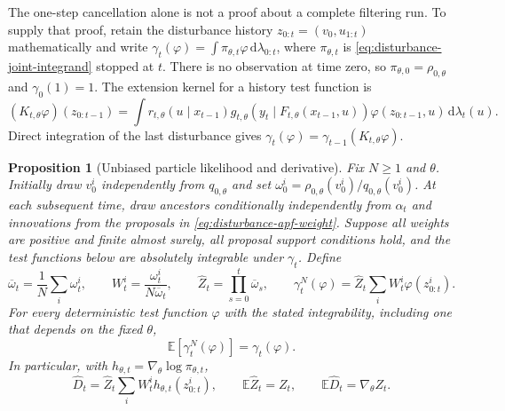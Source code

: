\documentclass[11pt]{article}
\newtheorem{proposition}{Proposition}
\newcommand{\dd}{\mathrm{d}}
\begin{document}
The one-step cancellation alone is not a proof about a complete filtering
run. To supply that proof, retain the disturbance history
$z_{0:t}=(v_0,u_{1:t})$ mathematically and write
$\gamma_t(\varphi)=\int\pi_{\theta,t}\varphi\,\dd\lambda_{0:t}$, where
$\pi_{\theta,t}$ is \eqref{eq:disturbance-joint-integrand} stopped at $t$.
There is no observation at time zero, so $\pi_{\theta,0}=\rho_{0,\theta}$
and $\gamma_0(1)=1$. The extension kernel for a history test function is
\begin{equation}
 (K_{t,\theta}\varphi)(z_{0:t-1})
 =\int r_{t,\theta}(u\mid x_{t-1})
       g_{t,\theta}(y_t\mid F_{t,\theta}(x_{t-1},u))
       \varphi(z_{0:t-1},u)\,\dd\lambda_t(u).
 \label{eq:disturbance-history-kernel}
\end{equation}
Direct integration of the last disturbance gives
$\gamma_t(\varphi)=\gamma_{t-1}(K_{t,\theta}\varphi)$.

\begin{proposition}[Unbiased particle likelihood and derivative]
\label{prop:disturbance-particle-induction}
Fix $N\geq1$ and $\theta$. Initially draw $v_0^i$ independently from
$q_{0,\theta}$ and set
$\omega_0^i=\rho_{0,\theta}(v_0^i)/q_{0,\theta}(v_0^i)$.
At each subsequent time, draw ancestors conditionally independently from
$\alpha_t$ and innovations from the proposals in
\eqref{eq:disturbance-apf-weight}. Suppose all weights are positive and
finite almost surely, all proposal support conditions hold, and the test
functions below are absolutely integrable under $\gamma_t$. Define
\begin{equation}
 \overline\omega_t=\frac1N\sum_i\omega_t^i,\qquad
 W_t^i=\frac{\omega_t^i}{N\overline\omega_t},\qquad
 \widehat Z_t=\prod_{s=0}^t\overline\omega_s,\qquad
 \gamma_t^N(\varphi)=\widehat Z_t\sum_iW_t^i\varphi(z_{0:t}^i).
 \label{eq:disturbance-particle-measure}
\end{equation}
For every deterministic test function $\varphi$ with the stated
integrability, including one that depends on the fixed $\theta$,
\begin{equation}
 \mathbb E[\gamma_t^N(\varphi)]=\gamma_t(\varphi).
 \label{eq:disturbance-particle-unbiasedness}
\end{equation}
In particular, with $h_{\theta,t}=\nabla_\theta\log\pi_{\theta,t}$,
\begin{equation}
 \widehat D_t=\widehat Z_t\sum_iW_t^i h_{\theta,t}(z_{0:t}^i),\qquad
 \mathbb E\widehat Z_t=Z_t,\qquad
 \mathbb E\widehat D_t=\nabla_\theta Z_t.
 \label{eq:disturbance-particle-derivative}
\end{equation}
\end{proposition}
\end{document}
